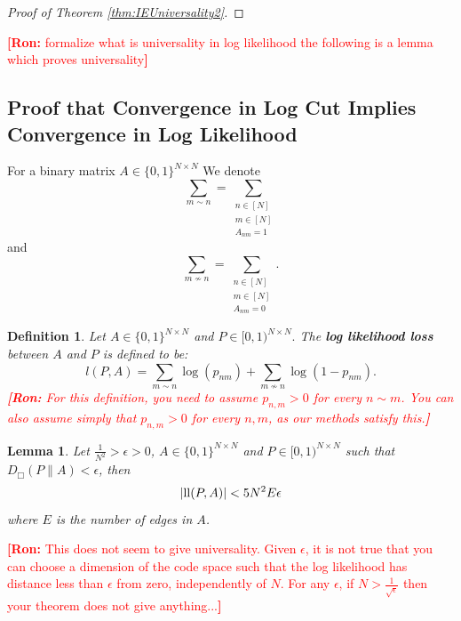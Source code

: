 \documentclass[letterpaper]{article} %
\newtheorem{lemma}[theorem]{Lemma}
\newtheorem{definition}[theorem]{Definition}
\newcommand{\ron}[1]{{{\textcolor{red}{\textbf{[Ron:} {#1}\textbf{]}}}}}
\begin{document}
\begin{proof}[Proof of Theorem \ref{thm:IEUniversality2}]
  
\end{proof}
\ron{formalize what is universality in log likelihood the following is a lemma which proves universality}
\begingroup
\color{blue}

\subsection{Proof that Convergence in Log Cut Implies Convergence in Log Likelihood}
For a binary matrix $A\in\{0,1\}^{N\times N}$ We denote 
    \begin{equation*}    
    \sum_{m\sim n} = \sum_{\substack{n\in [N] \\ m \in [N] \\ A_{nm} = 1}}
    \end{equation*}
    and
    \begin{equation}
    \label{eq:summation_notation}
    \sum_{m\not\sim n} = \sum_{\substack{n\in [N] \\ m \in [N] \\ A_{nm} = 0}}.
    \end{equation}
    
\begin{definition}
\label{def:log_likelihood}
    Let $A\in \{0,1\}^{N\times N}$ and $P \in [0,1)^{N\times N}.$ 
    The \textbf{log likelihood loss} between $A$ and $P$ is defined to be:
    \[l(P,A) = \sum_{m\sim n } \log(p_{nm}) + \sum_{m\not\sim n}\log(1 - p_{nm}).\]
    \ron{For this definition, you need to assume $p_{n,m}>0$ for every $n\sim m$. You can also assume simply that $p_{n,m}>0$ for every $n,m$, as our methods satisfy this.}  
\end{definition}
\begin{lemma}
    Let $\frac{1}{N^2}>\epsilon > 0$, $A\in \{0,1\}^{N\times N}$ and $P \in [0,1)^{N\times N}$ such that $D_\Box(P\|A) < \epsilon$, then 
    \[|{\rm ll}(P,A)| < 5N^2E\epsilon\] 
    where $E$ is the number of edges in $A$. 
\end{lemma}

\ron{This does not seem to give universality. Given $\epsilon$, it is not true that you can choose a dimension of the code space such that the log likelihood has distance less than $\epsilon$ from zero, independently of $N$. For any $\epsilon$, if $N>\frac{1}{\sqrt{\epsilon}}$ then your theorem does not give anything...}
\end{document}
